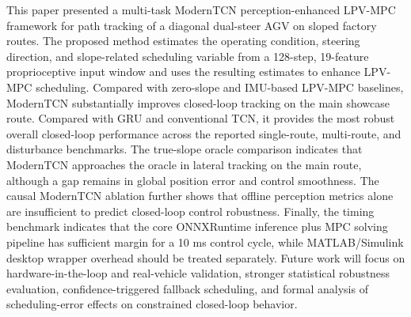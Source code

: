 \documentclass[twocolumn]{article}
\begin{document}
This paper presented a multi-task ModernTCN perception-enhanced LPV-MPC framework for path tracking of a diagonal dual-steer AGV on sloped factory routes. The proposed method estimates the operating condition, steering direction, and slope-related scheduling variable from a 128-step, 19-feature proprioceptive input window and uses the resulting estimates to enhance LPV-MPC scheduling. Compared with zero-slope and IMU-based LPV-MPC baselines, ModernTCN substantially improves closed-loop tracking on the main showcase route. Compared with GRU and conventional TCN, it provides the most robust overall closed-loop performance across the reported single-route, multi-route, and disturbance benchmarks. The true-slope oracle comparison indicates that ModernTCN approaches the oracle in lateral tracking on the main route, although a gap remains in global position error and control smoothness. The causal ModernTCN ablation further shows that offline perception metrics alone are insufficient to predict closed-loop control robustness. Finally, the timing benchmark indicates that the core ONNXRuntime inference plus MPC solving pipeline has sufficient margin for a 10 ms control cycle, while MATLAB/Simulink desktop wrapper overhead should be treated separately. Future work will focus on hardware-in-the-loop and real-vehicle validation, stronger statistical robustness evaluation, confidence-triggered fallback scheduling, and formal analysis of scheduling-error effects on constrained closed-loop behavior.
\end{document}

